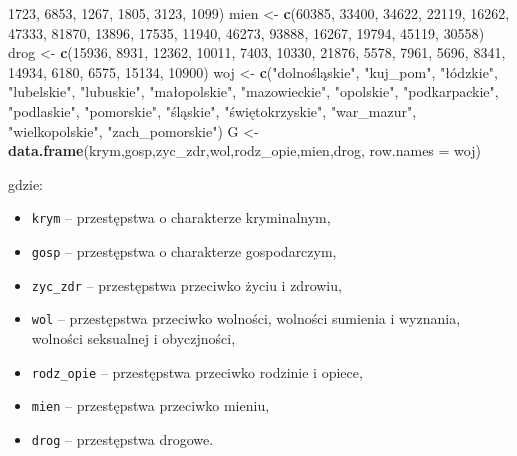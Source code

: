 \documentclass[polish,]{book}
\newenvironment{Shaded}{\begin{snugshade}}{\end{snugshade}}
\newcommand{\DataTypeTok}[1]{\textcolor[rgb]{0.13,0.29,0.53}{#1}}
\newcommand{\DecValTok}[1]{\textcolor[rgb]{0.00,0.00,0.81}{#1}}
\newcommand{\KeywordTok}[1]{\textcolor[rgb]{0.13,0.29,0.53}{\textbf{#1}}}
\newcommand{\NormalTok}[1]{#1}
\newcommand{\StringTok}[1]{\textcolor[rgb]{0.31,0.60,0.02}{#1}}
\begin{document}
\begin{Shaded}
\begin{Highlighting}[]
               \DecValTok{1723}\NormalTok{, }\DecValTok{6853}\NormalTok{, }\DecValTok{1267}\NormalTok{, }\DecValTok{1805}\NormalTok{, }\DecValTok{3123}\NormalTok{, }\DecValTok{1099}\NormalTok{)}
\NormalTok{mien <-}\StringTok{ }\KeywordTok{c}\NormalTok{(}\DecValTok{60385}\NormalTok{, }\DecValTok{33400}\NormalTok{, }\DecValTok{34622}\NormalTok{, }\DecValTok{22119}\NormalTok{, }\DecValTok{16262}\NormalTok{, }\DecValTok{47333}\NormalTok{, }\DecValTok{81870}\NormalTok{, }\DecValTok{13896}\NormalTok{, }\DecValTok{17535}\NormalTok{, }\DecValTok{11940}\NormalTok{,}
          \DecValTok{46273}\NormalTok{, }\DecValTok{93888}\NormalTok{, }\DecValTok{16267}\NormalTok{, }\DecValTok{19794}\NormalTok{, }\DecValTok{45119}\NormalTok{, }\DecValTok{30558}\NormalTok{)}
\NormalTok{drog <-}\StringTok{ }\KeywordTok{c}\NormalTok{(}\DecValTok{15936}\NormalTok{, }\DecValTok{8931}\NormalTok{, }\DecValTok{12362}\NormalTok{, }\DecValTok{10011}\NormalTok{, }\DecValTok{7403}\NormalTok{, }\DecValTok{10330}\NormalTok{, }\DecValTok{21876}\NormalTok{, }\DecValTok{5578}\NormalTok{, }\DecValTok{7961}\NormalTok{, }\DecValTok{5696}\NormalTok{,}
          \DecValTok{8341}\NormalTok{, }\DecValTok{14934}\NormalTok{, }\DecValTok{6180}\NormalTok{, }\DecValTok{6575}\NormalTok{, }\DecValTok{15134}\NormalTok{, }\DecValTok{10900}\NormalTok{)}
\NormalTok{woj <-}\StringTok{ }\KeywordTok{c}\NormalTok{(}\StringTok{"dolnośląskie"}\NormalTok{, }\StringTok{"kuj_pom"}\NormalTok{, }\StringTok{"łódzkie"}\NormalTok{, }\StringTok{"lubelskie"}\NormalTok{, }\StringTok{"lubuskie"}\NormalTok{, }\StringTok{"małopolskie"}\NormalTok{,}
         \StringTok{"mazowieckie"}\NormalTok{, }\StringTok{"opolskie"}\NormalTok{, }\StringTok{"podkarpackie"}\NormalTok{, }\StringTok{"podlaskie"}\NormalTok{, }\StringTok{"pomorskie"}\NormalTok{, }\StringTok{"śląskie"}\NormalTok{,}
         \StringTok{"świętokrzyskie"}\NormalTok{, }\StringTok{"war_mazur"}\NormalTok{, }\StringTok{"wielkopolskie"}\NormalTok{, }\StringTok{"zach_pomorskie"}\NormalTok{)}
\NormalTok{G <-}\KeywordTok{data.frame}\NormalTok{(krym,gosp,zyc_zdr,wol,rodz_opie,mien,drog,}
               \DataTypeTok{row.names =}\NormalTok{ woj) }
\end{Highlighting}
\end{Shaded}

gdzie:

\begin{itemize}
\item
  \texttt{krym} -- przestępstwa o charakterze kryminalnym,
\item
  \texttt{gosp} -- przestępstwa o charakterze gospodarczym,
\item
  \texttt{zyc\_zdr} -- przestępstwa przeciwko życiu i zdrowiu,
\item
  \texttt{wol} -- przestępstwa przeciwko wolności, wolności sumienia i wyznania, wolności
  seksualnej i obyczjności,
\item
  \texttt{rodz\_opie} -- przestępstwa przeciwko rodzinie i opiece,
\item
  \texttt{mien} -- przestępstwa przeciwko mieniu,
\item
  \texttt{drog} -- przestępstwa drogowe.
\end{itemize}
\end{document}
